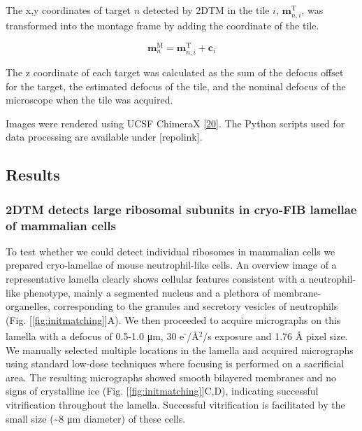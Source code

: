 \documentclass[
]{article}
\begin{document}
The x,y coordinates of target \(n\) detected by 2DTM in the tile \(i\),
\(\textbf{m}^\textrm{T}_{n,i}\), was transformed into the montage frame by adding
the coordinate of the tile.

\[ \textbf{m}^\textrm{M}_n = \textbf{m}^\textrm{T}_{n,i} + \textbf{c}_i\]

The z coordinate of each target was calculated as the sum of the defocus offset
for the target, the estimated defocus of the tile, and the nominal defocus of
the microscope when the tile was acquired.

Images were rendered using UCSF ChimeraX {[}\protect\hyperlink{ref-cYCuuZxG}{20}{]}. The Python scripts used for data processing are available
under {[}repolink{]}.

\hypertarget{results}{%
\subsection{Results}\label{results}}

\hypertarget{dtm-detects-large-ribosomal-subunits-in-cryo-fib-lamellae-of-mammalian-cells}{%
\subsubsection{2DTM detects large ribosomal subunits in cryo-FIB lamellae of mammalian cells}\label{dtm-detects-large-ribosomal-subunits-in-cryo-fib-lamellae-of-mammalian-cells}}

To test whether we could detect individual ribosomes in mammalian cells we
prepared cryo-lamellae of mouse neutrophil-like cells. An overview image
of a representative lamella clearly shows cellular features consistent with a
neutrophil-like phenotype, mainly a segmented nucleus and a plethora of
membrane-organelles, corresponding to the granules and secretory vesicles of
neutrophils (Fig. {[}\ref{fig:initmatching}{]}A). We then proceeded to acquire
micrographs on this lamella with a defocus of 0.5-1.0 μm, 30 e\textsuperscript{-}/Å\(^2\)/s
exposure and 1.76 Å pixel size. We manually selected multiple locations in the
lamella and acquired micrographs using standard low-dose techniques where
focusing is performed on a sacrificial area. The resulting micrographs showed
smooth bilayered membranes and no signs of crystalline ice (Fig.
{[}\ref{fig:initmatching}{]}C,D), indicating successful vitrification throughout the
lamella. Successful vitrification is facilitated by the small size (\textasciitilde8 μm diameter) of these cells.
\end{document}

